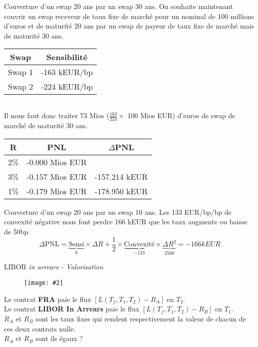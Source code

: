 \documentclass{beamer}
\newcommand{\FIG}[2]{\texttt{[image: \#2]}}
\begin{document}
\begin{frame}{Couverture d'un swap 20 ans par un swap 30 ans.}
On souhaite maintenant couvrir un swap receveur de taux fixe de marché pour un nominal de 100 millions d'euros et de maturité 20 ans par un swap de payeur de taux fixe de marché mais de maturité 30 ans.\\
\begin{center}
\begin{tabular}{|c|c|}
\hline
Swap&Sensibilité \\ 
\hline
Swap 1 &-163 kEUR/bp \\ 
Swap 2 &-224 kEUR/bp \\ 
\hline
\end{tabular}\begin{tabular}{|c|c|}
\end{tabular}
\end{center}
Il nous faut donc traiter 73 Mios ($\frac{163}{224} \times$ 100 Mios EUR)  d'euros de swap de marché de maturité  30 ans.
\begin{center}
\begin{tabular}{|c|c|c|}
\hline
R&PNL&$\Delta$PNL \\ 
\hline
2\% &-0.000 Mios EUR& \\ 
3\% &-0.157 Mios EUR&-157.214 kEUR\\ 
1\% &-0.179 Mios EUR&-178.950 kEUR\\ 
\hline
\end{tabular}
\end{center}
\end{frame}
\begin{frame}{Couverture d'un swap 20 ans par un swap 10 ans.}
Les 133 EUR/bp/bp de convexité négative nous font perdre 166 kEUR que les taux augmente ou baisse de 50bp.
\[
\Delta \text{PNL}=\underbrace{\text{Sensi}}_{0} \times \Delta R + \frac{1}{2} \times \underbrace{\text{Convexité}}_{-133} \times \underbrace{\Delta R^2}_{2500}=-166 kEUR
\]
\end{frame}

\begin{frame}{LIBOR \it{in arrears} \textnormal{- Valorisation}}
\begin{figure}[h]
\FIG{7cm}{figures/schema_fra.jpg} 
\end{figure}

Le contrat \textbf{FRA} paie le flux $[L(T_f,T_1,T_2)-R_A]$ en $T_2$.\\
Le contrat \textbf{LIBOR In Arrears} paie  le flux $[L(T_f,T_1,T_2)-R_B]$ en $T_1$.\\
$R_A$ et $R_B$ sont les taux fixes qui rendent respectivement la valeur de chacun de ces deux contrats nulle.\\
\vspace{0.5cm}
$R_A$ et $R_B$ sont ils égaux ?

\end{frame}
\end{document}
